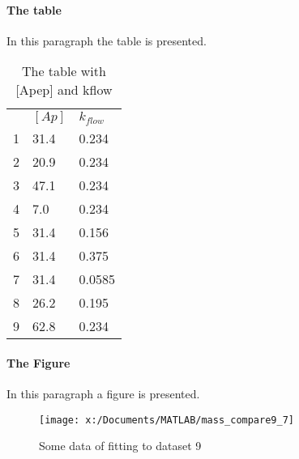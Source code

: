\documentclass{report}
\begin{document}
\paragraph{The table}
In this paragraph the table is presented.\\
\begin{table}[h!]
\centering
\caption{The table with [Apep] and kflow}
\begin{tabular}{r|a|d}   &   & \\ 
 1 & 31.4 & 0.234\\ 2 & 20.9 & 0.234\\ 3 & 47.1 & 0.234\\ 4 & 7.0 & 0.234\\ 5 & 31.4 & 0.156\\ 
6 & 31.4 & 0.375\\ 7 & 31.4 & 0.0585\\ 8 & 26.2 & 0.195\\ 9 & 62.8 & 0.234\\
\end{tabular}
\end{table}
\paragraph{The Figure}
In this paragraph a figure is presented.\\
\begin{figure}[h!]
\texttt{[image: x:/Documents/MATLAB/mass\_compare9\_7]}
\caption{Some data of fitting to dataset 9}
\label{fig:my_label}
\end{figure}
\end{document}
